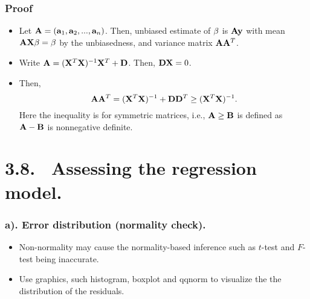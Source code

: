 \documentclass{beamer}
\def\bfA{{\bf A}}
\def\bfB{{\bf B}}
\def\bfD{{\bf D}}
\def\bfX{{\bf X}}
\def\bfa{{\bf a}}
\def\bfy{{\bf y}}
\begin{document}
      
      \begin{frame}
      	\frametitle{Proof}
      	\begin{itemize}
      		
      		\item  Let $\bfA = (\bfa_1, \bfa_2, ..., \bfa_n)$. 
      		Then, unbiased estimate of $\bf \beta$ is
      		$\bfA \bfy$ with mean $\bfA \bfX {\bf \beta} = {\bf \beta}$ by the unbiasedness, and variance matrix
      		$\bfA \bfA^T$.
      		\item  Write $\bfA= (\bfX^T \bfX)^{-1} \bfX^T +\bfD$.   Then, $\bfD\bfX=0$. 
      		\item Then, 
      		$$\bfA \bfA^T =  (\bfX^T \bfX)^{-1}  + \bfD \bfD^T  \geq  (\bfX^T \bfX  )^{-1}.$$
      		Here the inequality is for symmetric matrices, i.e., $\bfA \geq \bfB$ is defined
      		as $\bfA -\bfB$ is nonnegative definite.  	 
      	\end{itemize}
      \end{frame}
      
      
      \section{3.8. \  Assessing the regression model. }
      
      \begin{frame}
      	\frametitle{a). Error distribution (normality check). }
      	\begin{itemize}
      		
      		
      		\item  Non-normality may cause the normality-based inference
      		such as $t$-test and $F$-test being  inaccurate.
      		
      		
      		\item Use graphics, such histogram, boxplot and qqnorm to visualize the
      		the distribution of the residuals.
      		
      		
      	\end{itemize}
      \end{frame}
      
\end{document}

